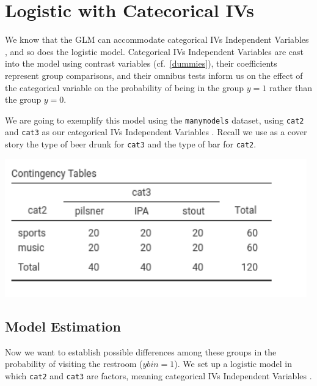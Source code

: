 \documentclass[
]{book}
\begin{document}
\hypertarget{gzlmanova}{%
\section{Logistic with Catecorical IVs}\label{gzlmanova}}

We know that the GLM can accommodate categorical {IVs {Independent Variables} }, and so does the logistic model. Categorical {IVs {Independent Variables} } are cast into the model using contrast variables (cf.~\ref{dummies}), their coefficients represent group comparisons, and their omnibus tests inform us on the effect of the categorical variable on the probability of being in the group \(y=1\) rather than the group \(y=0\).

We are going to exemplify this model using the \texttt{manymodels} dataset, using \texttt{cat2} and \texttt{cat3} as our categorical {IVs {Independent Variables} }. Recall we use as a cover story the type of beer drunk for \texttt{cat3} and the type of bar for \texttt{cat2}.

\includegraphics[width=5.15in]{bookletpics/3_logistic_output6}

\hypertarget{model-estimation-1}{%
\subsection{Model Estimation}\label{model-estimation-1}}

Now we want to establish possible differences among these groups in the probability of visiting the restroom (\(ybin=1\)). We set up a logistic model in which \texttt{cat2} and \texttt{cat3} are factors, meaning categorical {IVs {Independent Variables} }.
\end{document}
